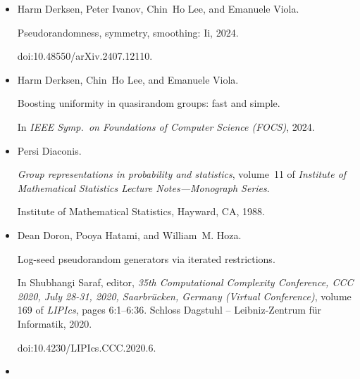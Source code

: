 \begin{itemize}
Group-theoretic algorithms for matrix multiplication.


In \emph{IEEE Symp. on Foundations of Computer Science (FOCS)}, pages
379–388, 2005.


doi:10.1109/SFCS.2005.39.





\item[] 
[11]

Harm Derksen, Peter Ivanov, Chin Ho Lee, and Emanuele Viola.


Pseudorandomness, symmetry, smoothing: Ii, 2024.


doi:10.48550/arXiv.2407.12110.





\item[] 
[12]

Harm Derksen, Chin Ho Lee, and Emanuele Viola.


Boosting uniformity in quasirandom groups: fast and simple.


In \emph{IEEE Symp. on Foundations of Computer Science (FOCS)}, 2024.





\item[] 
[13]

Persi Diaconis.


\emph{Group representations in probability and statistics}, volume 11
of \emph{Institute of Mathematical Statistics Lecture Notes—Monograph
Series}.


Institute of Mathematical Statistics, Hayward, CA, 1988.





\item[] 
[14]

Dean Doron, Pooya Hatami, and William M. Hoza.


Log-seed pseudorandom generators via iterated restrictions.


In Shubhangi Saraf, editor, \emph{35th Computational Complexity
Conference, CCC 2020, July 28-31, 2020, Saarbrücken, Germany (Virtual
Conference)}, volume 169 of \emph{LIPIcs}, pages 6:1–6:36. Schloss Dagstuhl
– Leibniz-Zentrum für Informatik, 2020.


doi:10.4230/LIPIcs.CCC.2020.6.





\item[] 
[15]


\end{itemize}
